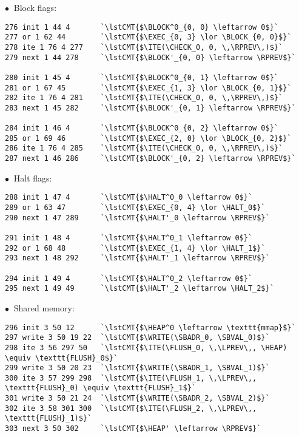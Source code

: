 \noindent
$\bullet\ $ Block flags:
\begin{lstlisting}[style=btor2]
276 init 1 44 4       `\lstCMT{$\BLOCK^0_{0, 0} \leftarrow 0$}`
277 or 1 62 44        `\lstCMT{$\EXEC_{0, 3} \lor \BLOCK_{0, 0}$}`
278 ite 1 76 4 277    `\lstCMT{$\ITE(\CHECK_0, 0, \,\RPREV\,)$}`
279 next 1 44 278     `\lstCMT{$\BLOCK'_{0, 0} \leftarrow \RPREV$}`

280 init 1 45 4       `\lstCMT{$\BLOCK^0_{0, 1} \leftarrow 0$}`
281 or 1 67 45        `\lstCMT{$\EXEC_{1, 3} \lor \BLOCK_{0, 1}$}`
282 ite 1 76 4 281    `\lstCMT{$\ITE(\CHECK_0, 0, \,\RPREV\,)$}`
283 next 1 45 282     `\lstCMT{$\BLOCK'_{0, 1} \leftarrow \RPREV$}`

284 init 1 46 4       `\lstCMT{$\BLOCK^0_{0, 2} \leftarrow 0$}`
285 or 1 69 46        `\lstCMT{$\EXEC_{2, 0} \lor \BLOCK_{0, 2}$}`
286 ite 1 76 4 285    `\lstCMT{$\ITE(\CHECK_0, 0, \,\RPREV\,)$}`
287 next 1 46 286     `\lstCMT{$\BLOCK'_{0, 2} \leftarrow \RPREV$}`
\end{lstlisting}

\noindent
$\bullet\ $ Halt flags:
\begin{lstlisting}[style=btor2]
288 init 1 47 4       `\lstCMT{$\HALT^0_0 \leftarrow 0$}`
289 or 1 63 47        `\lstCMT{$\EXEC_{0, 4} \lor \HALT_0$}`
290 next 1 47 289     `\lstCMT{$\HALT'_0 \leftarrow \RPREV$}`

291 init 1 48 4       `\lstCMT{$\HALT^0_1 \leftarrow 0$}`
292 or 1 68 48        `\lstCMT{$\EXEC_{1, 4} \lor \HALT_1$}`
293 next 1 48 292     `\lstCMT{$\HALT'_1 \leftarrow \RPREV$}`

294 init 1 49 4       `\lstCMT{$\HALT^0_2 \leftarrow 0$}`
295 next 1 49 49      `\lstCMT{$\HALT'_2 \leftarrow \HALT_2$}`
\end{lstlisting}

\noindent
$\bullet\ $ Shared memory:
\begin{lstlisting}[style=btor2]
296 init 3 50 12      `\lstCMT{$\HEAP^0 \leftarrow \texttt{mmap}$}`
297 write 3 50 19 22  `\lstCMT{$\WRITE(\SBADR_0, \SBVAL_0)$}`
298 ite 3 56 297 50   `\lstCMT{$\ITE(\FLUSH_0, \,\LPREV\,, \HEAP) \equiv \texttt{FLUSH}_0$}`
299 write 3 50 20 23  `\lstCMT{$\WRITE(\SBADR_1, \SBVAL_1)$}`
300 ite 3 57 299 298  `\lstCMT{$\ITE(\FLUSH_1, \,\LPREV\,, \texttt{FLUSH}_0) \equiv \texttt{FLUSH}_1$}`
301 write 3 50 21 24  `\lstCMT{$\WRITE(\SBADR_2, \SBVAL_2)$}`
302 ite 3 58 301 300  `\lstCMT{$\ITE(\FLUSH_2, \,\LPREV\,, \texttt{FLUSH}_1)$}`
303 next 3 50 302     `\lstCMT{$\HEAP' \leftarrow \RPREV$}`
\end{lstlisting}

